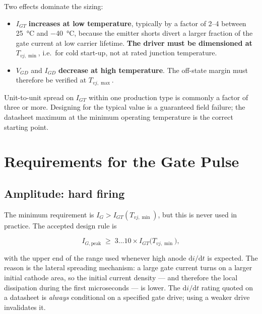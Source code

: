 \documentclass[11pt,a4paper]{article}
\begin{document}
Two effects dominate the sizing:

\begin{itemize}
  \item $I_{GT}$ \textbf{increases at low temperature}, typically by a factor of
        \numrange{2}{4} between \SI{25}{\celsius} and \SI{-40}{\celsius}, because
        the emitter shorts divert a larger fraction of the gate current at low
        carrier lifetime. \textbf{The driver must be dimensioned at
        $T_{vj,\min}$}, i.e.\ for cold start-up, not at rated junction temperature.
  \item $V_{GD}$ and $I_{GD}$ \textbf{decrease at high temperature}. The off-state
        margin must therefore be verified at $T_{vj,\max}$.
\end{itemize}

Unit-to-unit spread on $I_{GT}$ within one production type is commonly a factor of
three or more. Designing for the typical value is a guaranteed field failure; the
datasheet maximum at the minimum operating temperature is the correct starting
point.

\section{Requirements for the Gate Pulse}

\subsection{Amplitude: hard firing}

The minimum requirement is $I_G > I_{GT}(T_{vj,\min})$, but this is never used in
practice. The accepted design rule is

\begin{equation}
  I_{G,\text{peak}} \;\ge\; 3 \dots 10 \times I_{GT}\big(T_{vj,\min}\big),
  \label{eq:amp}
\end{equation}

with the upper end of the range used whenever high anode $\mathrm{d}i/\mathrm{d}t$
is expected. The reason is the lateral spreading mechanism: a large gate current
turns on a larger initial cathode area, so the initial current density --- and
therefore the local dissipation during the first microseconds --- is lower. The
$\mathrm{d}i/\mathrm{d}t$ rating quoted on a datasheet is \emph{always} conditional
on a specified gate drive; using a weaker drive invalidates it.
\end{document}
